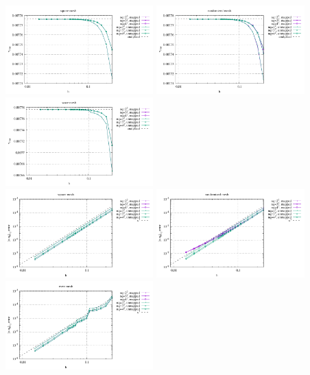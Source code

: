 \begin{center}
\includegraphics[width=5.7cm]{python_codes/fieldstone_76/results/bench3/reg/vrms}
\includegraphics[width=5.7cm]{python_codes/fieldstone_76/results/bench3/rand/vrms}
\includegraphics[width=5.7cm]{python_codes/fieldstone_76/results/bench3/wave/vrms}\\
\includegraphics[width=5.7cm]{python_codes/fieldstone_76/results/bench3/reg/errors_V}
\includegraphics[width=5.7cm]{python_codes/fieldstone_76/results/bench3/rand/errors_V}
\includegraphics[width=5.7cm]{python_codes/fieldstone_76/results/bench3/wave/errors_V}\\

\end{center}
